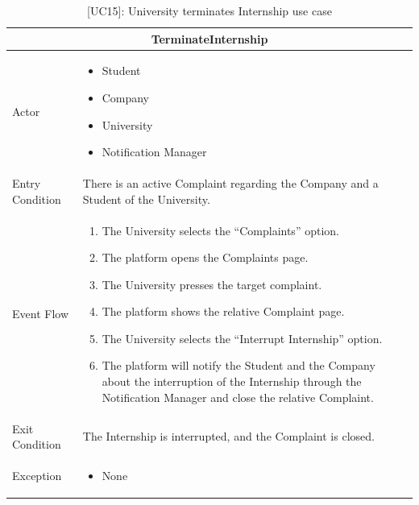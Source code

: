 \begin{table}[H]
    \centering
    \begin{tabular}{|p{3cm}|p{12cm}|}
    \hline
    \multicolumn{2}{|c|}{\textbf{TerminateInternship}} \\ \hline
    Actor & 
    \begin{itemize}
        \item Student
        \item Company
        \item University
        \item Notification Manager
    \end{itemize}\\ \hline
    Entry Condition & There is an active Complaint regarding the Company and a Student of the University. \\ \hline
    Event Flow & 
    \begin{enumerate}         
        \item The University selects the “Complaints” option.
        \item The platform opens the Complaints page.
        \item The University presses the target complaint.
        \item The platform shows the relative Complaint page.
        \item The University selects the “Interrupt Internship” option.
        \item The platform will notify the Student and the Company about the interruption of the Internship through the Notification Manager and close the relative Complaint.
    \end{enumerate} \\ \hline
    Exit Condition & The Internship is interrupted, and the Complaint is closed. \\ \hline
    Exception & 
    \begin{itemize}         
        \item None
    \end{itemize} \\ \hline  
    \end{tabular}
    \caption{[UC15]: University terminates Internship use case}
    \label{tab:UC15}
\end{table}
\clearpage

